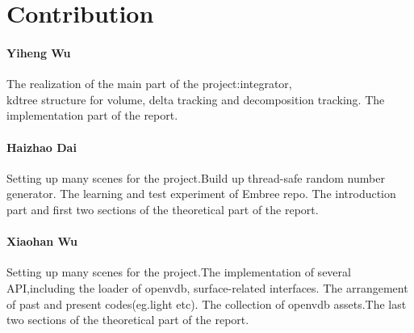 \documentclass[acmtog]{acmart}
\begin{document}
\section{Contribution}
\paragraph{Yiheng Wu} The realization of the main part of the project:integrator,\\kdtree structure for volume, delta tracking and decomposition tracking. The implementation part of the report.
\paragraph{Haizhao Dai} Setting up many scenes for the project.Build up thread-safe random number generator. The learning and test experiment of Embree repo. The introduction part and first two sections of the theoretical part of the report.
\paragraph{Xiaohan Wu} Setting up many scenes for the project.The implementation of several API,including the loader of openvdb, surface-related interfaces. The arrangement of past and present codes(eg.light etc). The collection of openvdb assets.The last two sections of the theoretical part of the report.
\end{document}
